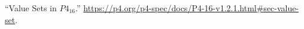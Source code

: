 \documentclass[11pt]{article}
\begin{document}
{{\begin{thebibliography}{39}
\mdbibitemlabel{{}[39]}\textquotedblleft{}Value Sets in $P4_{16}$.\textquotedblright{} \href{https://p4.org/p4-spec/docs/P4-16-v1.2.1.html\%23sec-value-set}{{\ttfamily https://\hspace{0pt}p4.\hspace{0pt}org/\hspace{0pt}p4-\hspace{0pt}spec/\hspace{0pt}docs/\hspace{0pt}P4-\hspace{0pt}16-\hspace{0pt}v1.\hspace{0pt}2.\hspace{0pt}1.\hspace{0pt}html\#\hspace{0pt}sec-\hspace{0pt}value-\hspace{0pt}set}}.\label{p4valuesets}%
\par%
\end{thebibliography}}%
}%
\end{document}
